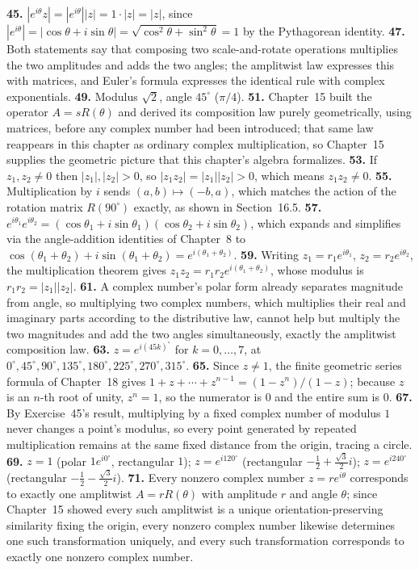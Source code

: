 \textbf{45.} $|e^{i\theta}z| = |e^{i\theta}||z| = 1\cdot|z| = |z|$,
since $|e^{i\theta}| = |\cos\theta+i\sin\theta| =
\sqrt{\cos^2\theta+\sin^2\theta} = 1$ by the Pythagorean identity. \quad
\textbf{47.} Both statements say that composing two scale-and-rotate
operations multiplies the two amplitudes and adds the two angles; the
amplitwist law expresses this with matrices, and Euler's formula
expresses the identical rule with complex exponentials. \quad
\textbf{49.} Modulus $\sqrt2$, angle $45^\circ$ ($\pi/4$). \quad
\textbf{51.} Chapter~15 built the operator $A=sR(\theta)$ and derived its
composition law purely geometrically, using matrices, before any
complex number had been introduced; that same law reappears in this
chapter as ordinary complex multiplication, so Chapter~15 supplies the
geometric picture that this chapter's algebra formalizes. \quad
\textbf{53.} If $z_1,z_2\neq0$ then $|z_1|,|z_2|>0$, so
$|z_1z_2|=|z_1||z_2|>0$, which means $z_1z_2\neq0$. \quad
\textbf{55.} Multiplication by $i$ sends $(a,b)\mapsto(-b,a)$, which
matches the action of the rotation matrix $R(90^\circ)$ exactly, as
shown in Section~16.5. \quad
\textbf{57.} $e^{i\theta_1}e^{i\theta_2} =
(\cos\theta_1+i\sin\theta_1)(\cos\theta_2+i\sin\theta_2)$, which expands
and simplifies via the angle-addition identities of Chapter~8 to
$\cos(\theta_1+\theta_2)+i\sin(\theta_1+\theta_2) =
e^{i(\theta_1+\theta_2)}$. \quad
\textbf{59.} Writing $z_1=r_1e^{i\theta_1}$, $z_2=r_2e^{i\theta_2}$, the
multiplication theorem gives $z_1z_2 = r_1r_2e^{i(\theta_1+\theta_2)}$,
whose modulus is $r_1r_2 = |z_1||z_2|$. \quad
\textbf{61.} A complex number's polar form already separates magnitude
from angle, so multiplying two complex numbers, which multiplies their
real and imaginary parts according to the distributive law, cannot help
but multiply the two magnitudes and add the two angles simultaneously,
exactly the amplitwist composition law. \quad
\textbf{63.} $z=e^{i(45k)^\circ}$ for $k=0,\dots,7$, at
$0^\circ,45^\circ,90^\circ,135^\circ,180^\circ,225^\circ,270^\circ,315^\circ$.
\quad
\textbf{65.} Since $z\neq1$, the finite geometric series formula of
Chapter~18 gives $1+z+\cdots+z^{n-1} = (1-z^n)/(1-z)$; because $z$ is an
$n$-th root of unity, $z^n=1$, so the numerator is $0$ and the entire sum
is $0$. \quad
\textbf{67.} By Exercise~45's result, multiplying by a fixed complex
number of modulus $1$ never changes a point's modulus, so every point
generated by repeated multiplication remains at the same fixed distance
from the origin, tracing a circle. \quad
\textbf{69.} $z=1$ (polar $1e^{i0^\circ}$, rectangular $1$); $z =
e^{i120^\circ}$ (rectangular $-\tfrac12+\tfrac{\sqrt3}{2}i$); $z =
e^{i240^\circ}$ (rectangular $-\tfrac12-\tfrac{\sqrt3}{2}i$). \quad
\textbf{71.} Every nonzero complex number $z=re^{i\theta}$ corresponds to
exactly one amplitwist $A=rR(\theta)$ with amplitude $r$ and angle
$\theta$; since Chapter~15 showed every such amplitwist is a unique
orientation-preserving similarity fixing the origin, every nonzero
complex number likewise determines one such transformation uniquely, and
every such transformation corresponds to exactly one nonzero complex
number.

